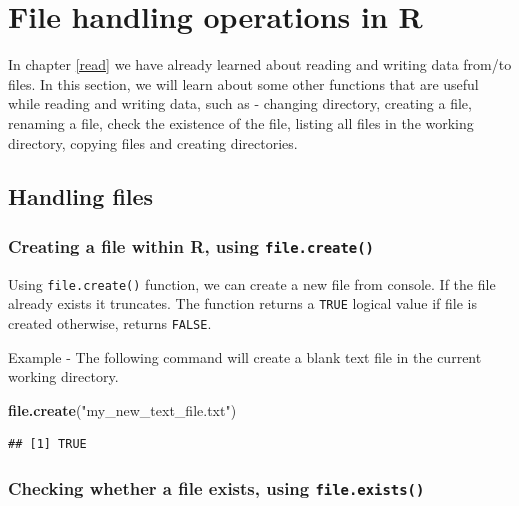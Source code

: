 \documentclass[
]{book}
\newenvironment{Shaded}{\begin{snugshade}}{\end{snugshade}}
\newcommand{\FunctionTok}[1]{\textcolor[rgb]{0.13,0.29,0.53}{\textbf{#1}}}
\newcommand{\NormalTok}[1]{#1}
\newcommand{\StringTok}[1]{\textcolor[rgb]{0.31,0.60,0.02}{#1}}
\begin{document}
\hypertarget{file}{%
\chapter{File handling operations in R}\label{file}}

In chapter \ref{read} we have already learned about reading and writing data from/to files. In this section, we will learn about some other functions that are useful while reading and writing data, such as - changing directory, creating a file, renaming a file, check the existence of the file, listing all files in the working directory, copying files and creating directories.

\hypertarget{handling-files}{%
\section{Handling files}\label{handling-files}}

\hypertarget{creating-a-file-within-r-using-file.create}{%
\subsection{\texorpdfstring{Creating a file within R, using \texttt{file.create()}}{Creating a file within R, using file.create()}}\label{creating-a-file-within-r-using-file.create}}

Using \texttt{file.create()} function, we can create a new file from console. If the file already exists it truncates. The function returns a \texttt{TRUE} logical value if file is created otherwise, returns \texttt{FALSE}.

Example - The following command will create a blank text file in the current working directory.

\begin{Shaded}
\begin{Highlighting}[]
\FunctionTok{file.create}\NormalTok{(}\StringTok{"my\_new\_text\_file.txt"}\NormalTok{)}
\end{Highlighting}
\end{Shaded}

\begin{verbatim}
## [1] TRUE
\end{verbatim}

\hypertarget{checking-whether-a-file-exists-using-file.exists}{%
\subsection{\texorpdfstring{Checking whether a file exists, using \texttt{file.exists()}}{Checking whether a file exists, using file.exists()}}\label{checking-whether-a-file-exists-using-file.exists}}
\end{document}
